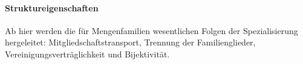 \documentclass[main.tex]{subfiles}
\begin{document}
\begin{tabproof}
\end{tabproof}

\paragraph{Struktureigenschaften}

Ab hier werden die für Mengenfamilien wesentlichen Folgen der Spezialisierung
hergeleitet: Mitgliedschaftstransport, Trennung der Familienglieder,
Vereinigungsverträglichkeit und Bijektivität.
\end{document}
